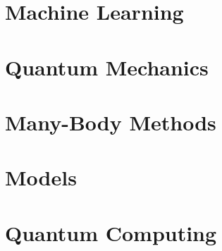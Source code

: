\chapter{Machine Learning}

\chapter{Quantum Mechanics}

\chapter{Many-Body Methods}

\chapter{Models}

\chapter{Quantum Computing}

